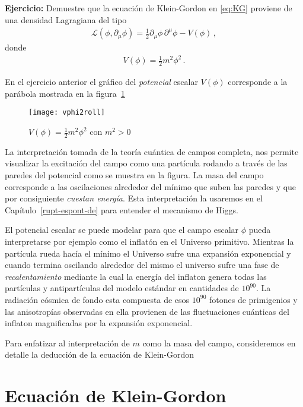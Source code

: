 \textbf{Ejercicio:} Demuestre que la ecuación de Klein-Gordon en \eqref{eq:KG} proviene de una densidad Lagragiana del tipo
\begin{align}
  \mathcal{L}(\phi,\partial_{\mu} \phi)=  \frac{1}{2}{\partial_\mu\phi}\,{\partial^\mu\phi}-V(\phi)\,,
\end{align}
donde
\begin{align}
  V(\phi)=\frac{1}{2}m^2 \phi^2\,.
\end{align}

En el ejercicio anterior el gráfico del \emph{potencial} escalar $V(\phi)$ corresponde a la parábola mostrada en la figura~\ref{fig:x2ini}


\begin{figure} %
  \centering %
  \texttt{[image: vphi2roll]}
  \caption{$V(\phi)=\frac{1}{2}m^2 \phi^2$ con $m^2\gt 0$} %
  \label{fig:x2ini} %
\end{figure} %



La interpretación tomada de la teoría cuántica de campos completa, nos permite visualizar la excitación del campo como una partícula rodando a través de las paredes del potencial como se muestra en la figura. La masa del campo corresponde a las oscilaciones alrededor del mínimo que suben las paredes y que por consiguiente \emph{cuestan energía}. Esta interpretación la usaremos en el Capítulo~\ref{rupt-espont-de} para entender el mecanismo de Higgs.

El potencial escalar se puede modelar para que el campo escalar $\phi$ pueda interpretarse por ejemplo como el inflatón en el Universo primitivo. Mientras la partícula rueda hacía el mínimo el Universo sufre una expansión exponencial y cuando termina oscilando alrededor del mismo el universo sufre una fase de \emph{recalentamiento} mediante la cual la energía del inflaton genera todas las partículas y antipartículas del modelo estándar en cantidades de $10^{90}$. La radiación cósmica de fondo esta compuesta de esos $10^{90}$ fotones de primigenios y las anisotropías observadas en ella provienen de las fluctuaciones cuánticas del inflaton magnificadas por la expansión exponencial.

Para enfatizar al interpretación de $m$ como la masa del campo, consideremos en detalle la deducción de la ecuación de Klein-Gordon


\section{Ecuación de Klein-Gordon}


